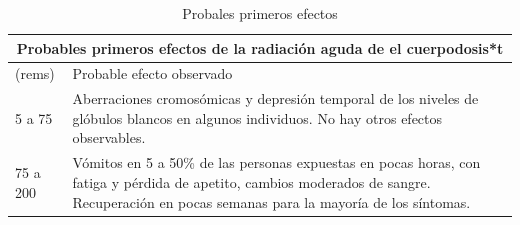 \documentclass{beamer}
\begin{document}
\begin{frame}
	
	\begin{table}[h!]
		\centering
		\begin{tabular}{||m{1cm}|m{20em}||}
			\hline
			\multicolumn{2}{|c|}{Probables primeros efectos de la radiación aguda de el cuerpodosis*t} \\
			\hline	\hline
			(rems)                                                            & Probable efecto observado                                                                                                                                                          \\ \hline
			5 a 75                                                                       & Aberraciones cromosómicas y depresión temporal de los niveles de glóbulos blancos en algunos individuos. No hay otros efectos observables.                                                                                                                                                                                                                                                                                                                          \\ \hline
			75 a 200                                                                     & Vómitos en 5 a 50\% de las personas expuestas en pocas horas, con fatiga y pérdida de apetito, cambios moderados de sangre. Recuperación en pocas semanas para la mayoría de los síntomas.                                                                                                                                                                                                                                                                          \\ \hline
		\end{tabular}
		\caption{Probales primeros efectos}
	\end{table}
	
\end{frame}

\end{document}
